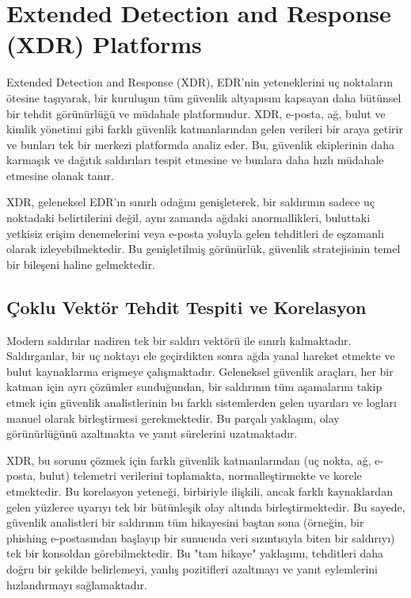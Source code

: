 \newpage

\section{Extended Detection and Response (XDR) Platforms}

Extended Detection and Response (XDR), EDR'nin yeteneklerini uç noktaların ötesine taşıyarak, bir kuruluşun tüm güvenlik altyapısını kapsayan daha bütünsel bir tehdit görünürlüğü ve müdahale platformudur. XDR, e-posta, ağ, bulut ve kimlik yönetimi gibi farklı güvenlik katmanlarından gelen verileri bir araya getirir ve bunları tek bir merkezi platformda analiz eder. Bu, güvenlik ekiplerinin daha karmaşık ve dağıtık saldırıları tespit etmesine ve bunlara daha hızlı müdahale etmesine olanak tanır.

XDR, geleneksel EDR'ın sınırlı odağını genişleterek, bir saldırının sadece uç noktadaki belirtilerini değil, aynı zamanda ağdaki anormallikleri, buluttaki yetkisiz erişim denemelerini veya e-posta yoluyla gelen tehditleri de eşzamanlı olarak izleyebilmektedir. Bu genişletilmiş görünürlük, güvenlik stratejisinin temel bir bileşeni haline gelmektedir.

\subsection{Çoklu Vektör Tehdit Tespiti ve Korelasyon}

Modern saldırılar nadiren tek bir saldırı vektörü ile sınırlı kalmaktadır. Saldırganlar, bir uç noktayı ele geçirdikten sonra ağda yanal hareket etmekte ve bulut kaynaklarına erişmeye çalışmaktadır. Geleneksel güvenlik araçları, her bir katman için ayrı çözümler sunduğundan, bir saldırının tüm aşamalarını takip etmek için güvenlik analistlerinin bu farklı sistemlerden gelen uyarıları ve logları manuel olarak birleştirmesi gerekmektedir. Bu parçalı yaklaşım, olay görünürlüğünü azaltmakta ve yanıt sürelerini uzatmaktadır.

XDR, bu sorunu çözmek için farklı güvenlik katmanlarından (uç nokta, ağ, e-posta, bulut) telemetri verilerini toplamakta, normalleştirmekte ve korele etmektedir. Bu korelasyon yeteneği, birbiriyle ilişkili, ancak farklı kaynaklardan gelen yüzlerce uyarıyı tek bir bütünleşik olay altında birleştirmektedir. Bu sayede, güvenlik analistleri bir saldırının tüm hikayesini baştan sona (örneğin, bir phishing e-postasından başlayıp bir sunucuda veri sızıntısıyla biten bir saldırıyı) tek bir konsoldan görebilmektedir. Bu "tam hikaye" yaklaşımı, tehditleri daha doğru bir şekilde belirlemeyi, yanlış pozitifleri azaltmayı ve yanıt eylemlerini hızlandırmayı sağlamaktadır.

